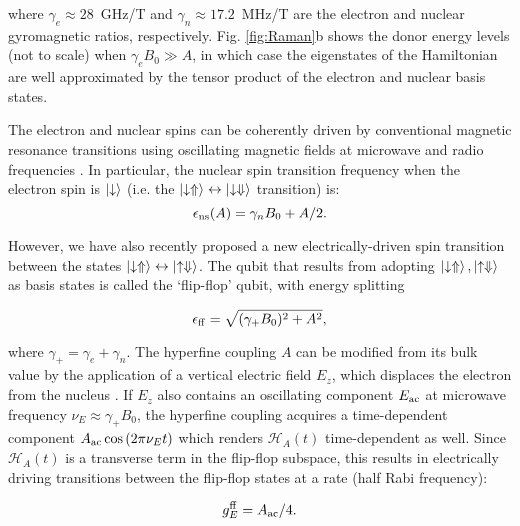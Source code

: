 \documentclass[
 aps,prb,twocolumn,
 amsmath,amssymb,superscriptaddress,
] {revtex4-1}
\begin{document}
where $\gamma_e\approx28$~GHz/T and $\gamma_n\approx17.2$~MHz/T are the electron and nuclear gyromagnetic ratios, respectively. Fig. \ref{fig:Raman}b shows the donor energy levels (not to scale) when $\gamma_eB_0\gg A$, in which case the eigenstates of the Hamiltonian are well approximated by the tensor product of the electron and nuclear basis states.

The electron and nuclear spins can be coherently driven by conventional magnetic resonance transitions using oscillating magnetic fields at microwave \cite{Pla2012} and radio frequencies \cite{Pla2013}. In particular, the nuclear spin transition frequency when the electron spin is $\ket{\downarrow}$ (i.e. the $\ket{\downarrow \Uparrow} \leftrightarrow \ket{\downarrow \Downarrow}$ transition) is:
\begin{equation} \label{eq:epsilon_ns}
\epsilon_{\rm ns}(A) = \gamma_nB_0 + A/2.
\end{equation}

However, we have also recently proposed \cite{Tosi2017} a new electrically-driven spin transition between the states $\ket{\downarrow\Uparrow}\leftrightarrow\ket{\uparrow\Downarrow}$. The qubit that results from adopting  $\ket{\downarrow\Uparrow}, \ket{\uparrow\Downarrow}$ as basis states is called the `flip-flop' qubit, with energy splitting

\begin{equation}
\epsilon_{\rm ff} = \sqrt{(\gamma_+ B_0)^2 + A^2},
\end{equation}

where $\gamma_+ = \gamma_e + \gamma_n$. The hyperfine coupling $A$ can be modified from its bulk value by the application of a vertical electric field $E_z$, which displaces the electron from the nucleus \cite{Kane1998,Laucht2015,Tosi2017}. If $E_z$ also contains an oscillating component $E_{\rm ac}$ at microwave frequency $\nu_E\approx \gamma_+ B_0$, the hyperfine coupling acquires a time-dependent component $A_{\rm ac}\cos{\left(2\pi\nu_E t\right)}$ which renders $\mathcal{H}_A(t)$ time-dependent as well. Since $\mathcal{H}_A(t)$ is a transverse term in the flip-flop subspace, this results in electrically driving transitions between the flip-flop states at a rate (half Rabi frequency):

\begin{equation}
g_E^{\rm ff}=A_{\rm ac}/4.
\end{equation}
\end{document}
